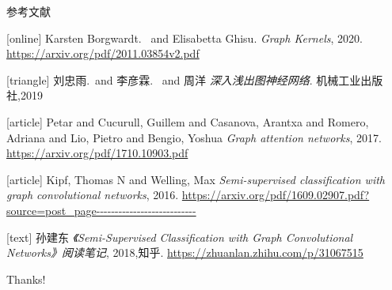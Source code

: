 \documentclass[UTF8, aspectratio=169 , 10pt，punct=kaiming]{beamer} %
\begin{document}
\begin{frame}[allowframebreaks]{参考文献}
  \scriptsize
  \begin{thebibliography}{}
  [online]
        Karsten Borgwardt. \ and Elisabetta Ghisu.
        \newblock \emph{Graph Kernels}, 2020.
        \newblock \url{https://arxiv.org/pdf/2011.03854v2.pdf}

  [triangle]
    刘忠雨.\ and 李彦霖. \ and 周洋
    \newblock \emph{深入浅出图神经网络}.
    \newblock 机械工业出版社,2019

  [article]
    Petar and Cucurull, Guillem and Casanova, Arantxa and Romero, Adriana and Lio, Pietro and Bengio, Yoshua
    \newblock \emph{Graph attention networks}, 2017.
    \newblock \url{https://arxiv.org/pdf/1710.10903.pdf}

    [article]
    Kipf, Thomas N and Welling, Max
    \newblock \emph{Semi-supervised classification with graph convolutional networks}, 2016.
    \newblock \url{https://arxiv.org/pdf/1609.02907.pdf?source=post_page---------------------------}

    [text]
    孙建东
    \newblock \emph{《Semi-Supervised Classification with Graph Convolutional Networks》阅读笔记}, 2018,知乎.
    \newblock \url{https://zhuanlan.zhihu.com/p/31067515}

  \end{thebibliography}
\end{frame}

\begin{frame}[plain]
  \begin{center}
    {\Huge\calligra Thanks!}
  \end{center}
\end{frame}
\end{document}
